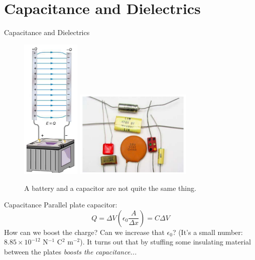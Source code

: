 \documentclass{beamer}
\begin{document}
\section{Capacitance and Dielectrics}

\begin{frame}{Capacitance and Dielectrics}
\begin{figure}
\centering
\includegraphics[width=0.25\textwidth]{figures/batt2.png}
\includegraphics[width=0.5\textwidth]{figures/batt3.png}
\caption{\label{fig:batt2} A battery and a capacitor are not quite the same thing.}
\end{figure}
\end{frame}

\begin{frame}{Capacitance}
Parallel plate capacitor:
\begin{equation}
\boxed{
Q = \Delta V \left(\epsilon_0 \frac{A}{\Delta x}\right) = C\Delta V}
\end{equation}
How can we boost the charge?  Can we increase that $\epsilon_0$?  (It's a small number: $8.85 \times 10^{-12}$ N$^{-1}$ C$^2$ m$^{-2}$).  It turns out that by stuffing some insulating material between the plates \textit{boosts the capacitance...}
\end{frame}
\end{document}
